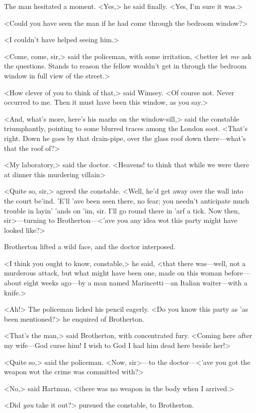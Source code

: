 The man hesitated a moment. <Yes,> he said finally. <Yes, I'm sure it was.>

<Could you have seen the man if he had come through the bedroom window?>

<I couldn't have helped seeing him.>

<Come, come, sir,> said the policeman, with some irritation, <better let \textit{me} ask the questions. Stands to reason the fellow wouldn't get in through the bedroom window in full view of the street.>

<How clever of you to think of that,> said Wimsey. <Of course not. Never occurred to me. Then it must have been this window, as you say.>

<And, what's more, here's his marks on the window-sill,> said the constable triumphantly, pointing to some blurred traces among the London soot. <That's right. Down he goes by that drain-pipe, over the glass roof down there—what's that the roof of?>

<My laboratory,> said the doctor. <Heavens! to think that while we were there at dinner this murdering villain\longdash>

<Quite so, sir,> agreed the constable. <Well, he'd get away over the wall into the court be'ind. 'E'll 'ave been seen there, no fear; you needn't anticipate much trouble in layin' 'ands on 'im, sir. I'll go round there in 'arf a tick. Now then, sir>—turning to Brotherton—<'ave you any idea wot this party might have looked like?>

Brotherton lifted a wild face, and the doctor interposed.

<I think you ought to know, constable,> he said, <that there was—well, not a murderous attack, but what might have been one, made on this woman before—about eight weeks ago—by a man named Marincetti—an Italian waiter—with a knife.>

<Ah!> The policeman licked his pencil eagerly. <Do you know this party as 'as been mentioned?> he enquired of Brotherton.

<That's the man,> said Brotherton, with concentrated fury. <Coming here after my wife—God curse him! I wish to God I had him dead here beside her!>

<Quite so,> said the policeman. <Now, sir>—to the doctor—<'ave you got the weapon wot the crime was committed with?>

<No,> said Hartman, <there was no weapon in the body when I arrived.>

<Did \textit{you} take it out?> pursued the constable, to Brotherton.

